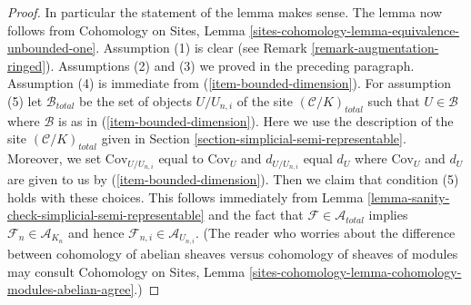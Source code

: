 \documentclass{stacks-project}
\theoremstyle{plain}
\theoremstyle{definition}
\theoremstyle{remark}
\numberwithin{equation}{subsection}
\begin{document}
\begin{proof}
\medskip\noindent
In particular the statement of the lemma makes sense.
The lemma now follows from Cohomology on Sites,
Lemma \ref{sites-cohomology-lemma-equivalence-unbounded-one}.
Assumption (1) is clear (see Remark \ref{remark-augmentation-ringed}).
Assumptions (2) and (3) we proved in the preceding paragraph.
Assumption (4) is immediate from (\ref{item-bounded-dimension}).
For assumption (5) let $\mathcal{B}_{total}$ be the set of
objects $U/U_{n, i}$ of the site $(\mathcal{C}/K)_{total}$
such that $U \in \mathcal{B}$ where $\mathcal{B}$ is as in
(\ref{item-bounded-dimension}). Here we use the description of
the site $(\mathcal{C}/K)_{total}$ given in
Section \ref{section-simplicial-semi-representable}.
Moreover, we set $\text{Cov}_{U/U_{n, i}}$ equal to $\text{Cov}_U$
and $d_{U/U_{n, i}}$ equal $d_U$ where $\text{Cov}_U$ and $d_U$
are given to us by (\ref{item-bounded-dimension}).
Then we claim that condition (5) holds with these choices.
This follows immediately from
Lemma \ref{lemma-sanity-check-simplicial-semi-representable}
and the fact that $\mathcal{F} \in \mathcal{A}_{total}$
implies $\mathcal{F}_n \in \mathcal{A}_{K_n}$ and hence
$\mathcal{F}_{n, i} \in \mathcal{A}_{U_{n, i}}$.
(The reader who worries about the difference between
cohomology of abelian sheaves versus cohomology
of sheaves of modules may consult Cohomology on Sites, Lemma
\ref{sites-cohomology-lemma-cohomology-modules-abelian-agree}.)
\end{proof}
\end{document}
